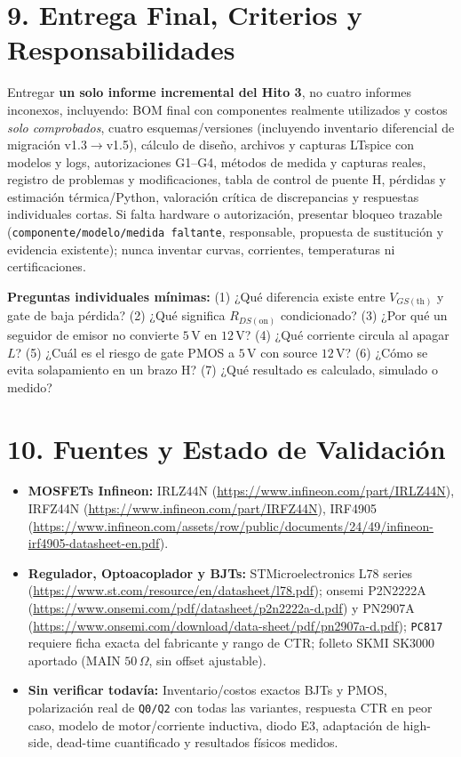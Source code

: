 \documentclass[10pt, a4paper, landscape]{article}
\begin{document}
\section*{9. Entrega Final, Criterios y Responsabilidades}
Entregar \textbf{un solo informe incremental del Hito 3}, no cuatro informes inconexos, incluyendo: BOM final con componentes realmente utilizados y costos \textit{solo comprobados}, cuatro esquemas/versiones (incluyendo inventario diferencial de migración v1.3$\rightarrow$v1.5), cálculo de diseño, archivos y capturas LTspice con modelos y logs, autorizaciones G1--G4, métodos de medida y capturas reales, registro de problemas y modificaciones, tabla de control de puente H, pérdidas y estimación térmica/Python, valoración crítica de discrepancias y respuestas individuales cortas. Si falta hardware o autorización, presentar bloqueo trazable (\texttt{componente/modelo/medida faltante}, responsable, propuesta de sustitución y evidencia existente); nunca inventar curvas, corrientes, temperaturas ni certificaciones.

\noindent\textbf{Preguntas individuales mínimas:} (1) ¿Qué diferencia existe entre $V_{GS(\text{th})}$ y gate de baja pérdida? (2) ¿Qué significa $R_{DS(\text{on})}$ condicionado? (3) ¿Por qué un seguidor de emisor no convierte $5\,\text{V}$ en $12\,\text{V}$? (4) ¿Qué corriente circula al apagar $L$? (5) ¿Cuál es el riesgo de gate PMOS a $5\,\text{V}$ con source $12\,\text{V}$? (6) ¿Cómo se evita solapamiento en un brazo H? (7) ¿Qué resultado es calculado, simulado o medido?

\section*{10. Fuentes y Estado de Validación}
\begin{itemize}[noitemsep, topsep=2pt]
    \item \textbf{MOSFETs Infineon:} IRLZ44N (\url{https://www.infineon.com/part/IRLZ44N}), IRFZ44N (\url{https://www.infineon.com/part/IRFZ44N}), IRF4905 (\url{https://www.infineon.com/assets/row/public/documents/24/49/infineon-irf4905-datasheet-en.pdf}).
    \item \textbf{Regulador, Optoacoplador y BJTs:} STMicroelectronics L78 series (\url{https://www.st.com/resource/en/datasheet/l78.pdf}); onsemi P2N2222A (\url{https://www.onsemi.com/pdf/datasheet/p2n2222a-d.pdf}) y PN2907A (\url{https://www.onsemi.com/download/data-sheet/pdf/pn2907a-d.pdf}); \texttt{PC817} requiere ficha exacta del fabricante y rango de CTR; folleto SKMI SK3000 aportado (MAIN $50\,\Omega$, sin offset ajustable).
    \item \textbf{Sin verificar todavía:} Inventario/costos exactos BJTs y PMOS, polarización real de \texttt{Q0/Q2} con todas las variantes, respuesta CTR en peor caso, modelo de motor/corriente inductiva, diodo E3, adaptación de high-side, dead-time cuantificado y resultados físicos medidos.
\end{itemize}
\end{document}
